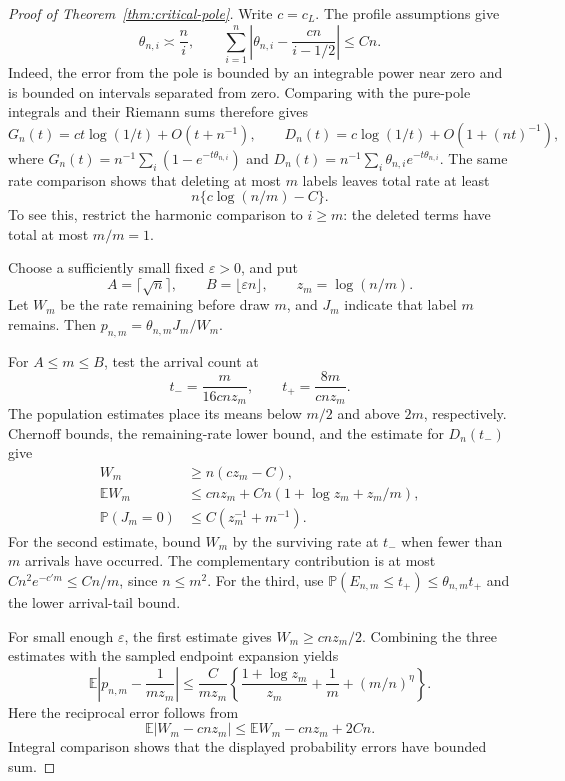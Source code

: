 \documentclass[11pt]{article}
\theoremstyle{remark}
\theoremstyle{plain}
\newcommand{\E}{\mathbb E}
\newcommand{\Pp}{\mathbb P}
\newcommand{\eps}{\varepsilon}
\begin{document}
\begin{proof}[Proof of Theorem~\ref{thm:critical-pole}]
Write $c=c_L$.  The profile assumptions give
\begin{equation}\label{eq:sp-critical-global-comparison}
 \theta_{n,i}\asymp \frac ni,
 \qquad
 \sum_{i=1}^n\left|\theta_{n,i}-\frac{cn}{i-1/2}\right|\le Cn.
\end{equation}
Indeed, the error from the pole is bounded by an integrable power
near zero and is bounded on intervals separated from zero.
Comparing with the pure-pole integrals and their Riemann sums
therefore gives
\begin{equation}\label{eq:sp-critical-transforms}
 G_n(t)=ct\log(1/t)+O(t+n^{-1}),\qquad
 D_n(t)=c\log(1/t)+O(1+(nt)^{-1}),
\end{equation}
where $G_n(t)=n^{-1}\sum_i(1-e^{-t\theta_{n,i}})$ and
$D_n(t)=n^{-1}\sum_i\theta_{n,i}e^{-t\theta_{n,i}}$.
The same rate comparison shows that deleting at most $m$ labels
leaves total rate at least
\[
 n\{c\log(n/m)-C\}.
\]
To see this, restrict the harmonic comparison to $i\ge m$: the
deleted terms have total at most $m/m=1$.

Choose a sufficiently small fixed $\eps>0$, and put
\[
 A=\lceil\sqrt n\rceil,\qquad B=\lfloor\eps n\rfloor,
 \qquad z_m=\log(n/m).
\]
Let $W_m$ be the rate remaining before draw $m$, and $J_m$ indicate
that label $m$ remains.  Then $p_{n,m}=\theta_{n,m}J_m/W_m$.

For $A\le m\le B$, test the arrival count at
\[
 t_-=\frac{m}{16cnz_m},\qquad t_+=\frac{8m}{cnz_m}.
\]
The population estimates place its means below $m/2$ and above
$2m$, respectively.  Chernoff bounds, the remaining-rate lower
bound, and the estimate for $D_n(t_-)$ give
\[
 \begin{aligned}
 W_m&\ge n(cz_m-C),\\
 \E W_m&\le cnz_m+Cn(1+\log z_m+z_m/m),\\
 \Pp(J_m=0)&\le C(z_m^{-1}+m^{-1}).
 \end{aligned}
\]
For the second estimate, bound $W_m$ by the surviving rate at $t_-$
when fewer than $m$ arrivals have occurred.  The complementary
contribution is at most $Cn^2e^{-c'm}\le Cn/m$, since $n\le m^2$.
For the third, use $\Pp(E_{n,m}\le t_+)\le\theta_{n,m}t_+$ and the
lower arrival-tail bound.

For small enough $\eps$, the first estimate gives
$W_m\ge cnz_m/2$.  Combining the three estimates with the sampled
endpoint expansion yields
\[
 \E\left|p_{n,m}-\frac1{mz_m}\right|
 \le \frac C{mz_m}
 \left\{\frac{1+\log z_m}{z_m}+\frac1m+(m/n)^\eta\right\}.
\]
Here the reciprocal error follows from
\[
 \E|W_m-cnz_m|
 \le \E W_m-cnz_m+2Cn.
\]
Integral comparison shows that the displayed probability errors
have bounded sum.


\end{proof}
\end{document}
